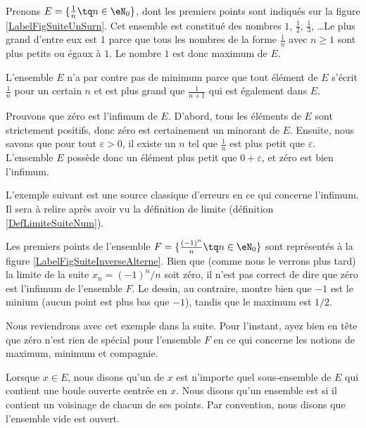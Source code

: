 \begin{example}
	Prenons $E=\{ \frac{1}{ n }\tq n\in\eN_0 \}$, dont les premiers points sont indiqués sur la figure \ref{LabelFigSuiteUnSurn}. Cet ensemble est constitué des nombres $1$, $\frac{ 1 }{2}$, $\frac{1}{ 3 }$, \ldots Le plus grand d'entre eux est $1$ parce que tous les nombres de la forme $\frac{1}{ n }$ avec $n\geq 1$ sont plus petits ou égaux à $1$. Le nombre $1$ est donc maximum de $E$.

	L'ensemble $E$ n'a par contre pas de minimum parce que tout élément de $E$ s'écrit $\frac{1}{ n }$ pour un certain $n$ et est plus grand que $\frac{1}{ n+1 }$ qui est également dans $E$.

	Prouvons que zéro est l'infimum de $E$. D'abord, tous les éléments de $E$ sont strictement positifs, donc zéro est certainement un minorant de $E$. Ensuite, nous savons que pour tout $\varepsilon>0$, il existe un $n$ tel que $\frac{1}{ n }$ est plus petit que $\varepsilon$. L'ensemble $E$ possède donc un élément plus petit que $0+\varepsilon$, et zéro est bien l'infimum.
\end{example}

\newcommand{\CaptionFigSuiteUnSurn}{Les premiers points du type $x_n=1/n$.}


L'exemple suivant est une source classique d'erreurs en ce qui concerne l'infimum. Il sera à relire après avoir vu la définition de limite (définition \ref{DefLimiteSuiteNum}).

\begin{example}
	Les premiers points de l'ensemble $F=\{ \frac{ (-1)^n }{ n }\tq n\in\eN_0 \}$ sont représentés à la figure \ref{LabelFigSuiteInverseAlterne}. Bien que (comme nous le verrons plus tard) la limite de la suite $x_n=(-1)^n/n$ soit zéro, il n'est pas correct de dire que zéro est l'infimum de l'ensemble $F$. Le dessin, au contraire, montre bien que $-1$ est le minium (aucun point est plus bas que $-1$), tandis que le maximum est $1/2$.

	Nous reviendrons avec cet exemple dans la suite. Pour l'instant, ayez bien en tête que zéro n'est rien de spécial pour l'ensemble $F$ en ce qui concerne les notions de maximum, minimum et compagnie.
\end{example}
\newcommand{\CaptionFigSuiteInverseAlterne}{Les quelque premiers points du type $(-1)^n/n$.}


Lorsque $x\in E$, nous disons qu'un  de $x$ est n'importe quel sous-ensemble de $E$ qui contient une boule ouverte centrée en $x$. Nous disons qu'un ensemble est  si il contient un voisinage de chacun de ses points. Par convention, nous disons que l'ensemble vide est ouvert.

